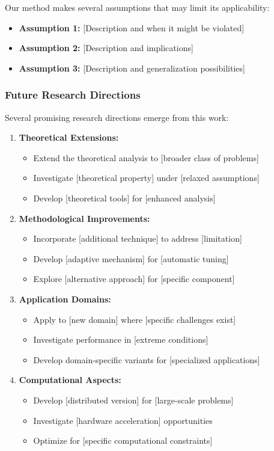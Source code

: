Our method makes several assumptions that may limit its applicability:
\begin{itemize}
    \item \textbf{Assumption 1:} [Description and when it might be violated]
    \item \textbf{Assumption 2:} [Description and implications]
    \item \textbf{Assumption 3:} [Description and generalization possibilities]
\end{itemize}

\subsubsection{Future Research Directions}

Several promising research directions emerge from this work:

\begin{enumerate}
    \item \textbf{Theoretical Extensions:} 
    \begin{itemize}
        \item Extend the theoretical analysis to [broader class of problems]
        \item Investigate [theoretical property] under [relaxed assumptions]
        \item Develop [theoretical tools] for [enhanced analysis]
    \end{itemize}
    
    \item \textbf{Methodological Improvements:}
    \begin{itemize}
        \item Incorporate [additional technique] to address [limitation]
        \item Develop [adaptive mechanism] for [automatic tuning]
        \item Explore [alternative approach] for [specific component]
    \end{itemize}
    
    \item \textbf{Application Domains:}
    \begin{itemize}
        \item Apply to [new domain] where [specific challenges exist]
        \item Investigate performance in [extreme conditions]
        \item Develop domain-specific variants for [specialized applications]
    \end{itemize}
    
    \item \textbf{Computational Aspects:}
    \begin{itemize}
        \item Develop [distributed version] for [large-scale problems]
        \item Investigate [hardware acceleration] opportunities
        \item Optimize for [specific computational constraints]
    \end{itemize}
\end{enumerate}

